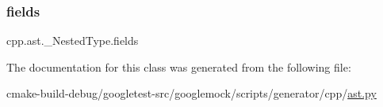 \subsubsection{\texorpdfstring{fields}{fields}}
{\footnotesize\ttfamily cpp.\+ast.\+\_\+\+Nested\+Type.\+fields}



The documentation for this class was generated from the following file\+:\begin{DoxyCompactItemize}
\item 
cmake-\/build-\/debug/googletest-\/src/googlemock/scripts/generator/cpp/\mbox{\hyperlink{ast_8py}{ast.\+py}}\end{DoxyCompactItemize}

